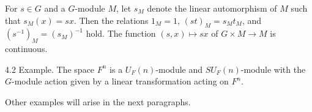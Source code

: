 For $s \in G$ and a $G$-module $M$, let $s_M$ denote the linear automorphism of $M$ such that $s_M(x) = sx$. Then the relations $1_M = 1$, $(st)_M = s_M t_M$, and $(s^{-1})_M = (s_M)^{-1}$ hold. The function $(s, x) \mapsto sx$ of $G \times M \rightarrow M$ is continuous.

4.2 Example. The space $F^n$ is a $U_F(n)$-module and $SU_F(n)$-module with the $G$-module action given by a linear transformation acting on $F^n$.

Other examples will arise in the next paragraphs.
